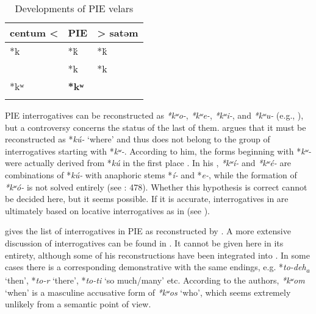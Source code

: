 \begin{table}
\caption{Developments of PIE velars \citep[58]{Fortson2010}}
\label{tab:indo:2}

\begin{tabularx}{\textwidth}{XXl}
\lsptoprule

 \textbf{centum <} & \textbf{PIE} & \textbf{> satəm}\\
 \midrule 
 *k & *ḱ & *ḱ\\
& *k & *k\\
 *kʷ & \textbf{*kʷ} & \\
\lspbottomrule
\end{tabularx}
\end{table}

PIE interrogatives can be reconstructed as \textit{*kʷ}\textit{o-}, \textit{*kʷ}\textit{e-}, \textit{*kʷ}\textit{i-}, and \textit{*kʷ}\textit{u-} (e.g., \citealt{CysouwHackstein2011}), but a controversy concerns the status of the last of them. \citet[436--441]{Dunkel2014} argues that it must be reconstructed as *\textit{kú-} ‘where’ and thus does not belong to the group of interrogatives starting with *\textit{kʷ}\textit{-}. According to him, the forms beginning with *\textit{kʷ}\textit{-} were actually derived from *\textit{kú} in the first place \citep[436]{Dunkel2014}. In his , \textit{*kʷ}\textit{í-} and \textit{*kʷ}\textit{é-} are combinations of *\textit{kú-} with anaphoric stems *\textit{í-} and *\textit{e-}, while the formation of \textit{*kʷ}\textit{ó-} is not solved entirely (see \citealt{Dunkel2014}: 478). Whether this hypothesis is correct cannot be decided here, but it seems possible. If it is accurate, interrogatives in  are ultimately based on locative interrogatives as in  (see ).

 gives the list of interrogatives in PIE as reconstructed by \citet{MalloryAdams2006}. A more extensive discussion of interrogatives can be found in \citet[453-479]{Dunkel2014}. It cannot be given here in its entirety, although some of his reconstructions have been integrated into . In some cases there is a corresponding demonstrative with the same endings, e.g. *\textit{to-deh\textsubscript{a}} ‘then’, *\textit{to-r} ‘there’, *\textit{to-ti} ‘so much/many’ etc. According to the authors, \textit{*kʷ}\textit{om} ‘when’ is a masculine accusative form of \textit{*kʷ}\textit{os} ‘who’, which seems extremely unlikely from a semantic point of view.

